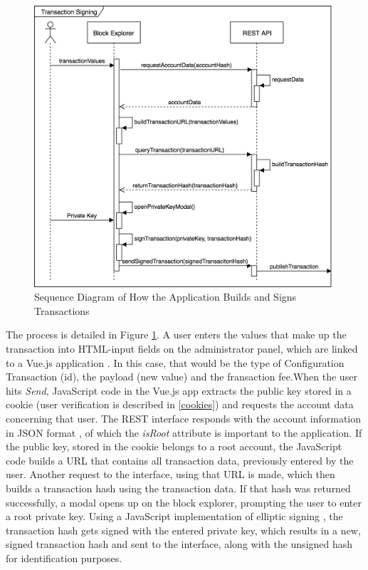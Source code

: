 \begin{figure}
  \includegraphics[scale=0.35]{transactionbuilding.png}
  \centering
  \caption{Sequence Diagram of How the Application Builds and Signs Transactions}
  \label{fig:sequence1}
\end{figure}

The process is detailed in Figure \ref{fig:sequence1}. A user enters the values that make up the transaction into HTML-input fields on the administrator panel, which are linked to a Vue.js application \cite{vue} . In this case, that would be the type of Configuration Transaction (id), the payload (new value) and the fransaction fee.When the user hits \emph{Send}, JavaScript code in the Vue.js app extracts the public key stored in a cookie \cite{vcookies} (user verification is described in \ref{cookies}) and requests the account data concerning that user. The REST interface responds with the account information in JSON format \cite{json} , of which the \emph{isRoot} attribute is important to the application. If the public key, stored in the cookie belongs to a root account, the JavaScript code builds a URL that contains all transaction data, previously entered by the user. Another request to the interface, using that URL is made, which then builds a transaction hash using the transaction data. If that hash was returned successfully, a modal opens up on the block explorer, prompting the user to enter a root private key. Using a JavaScript implementation of elliptic signing \cite{elliptic}, the transaction hash gets signed with the entered private key, which results in a new, signed transaction hash and sent to the interface, along with the unsigned hash for identification purposes.

